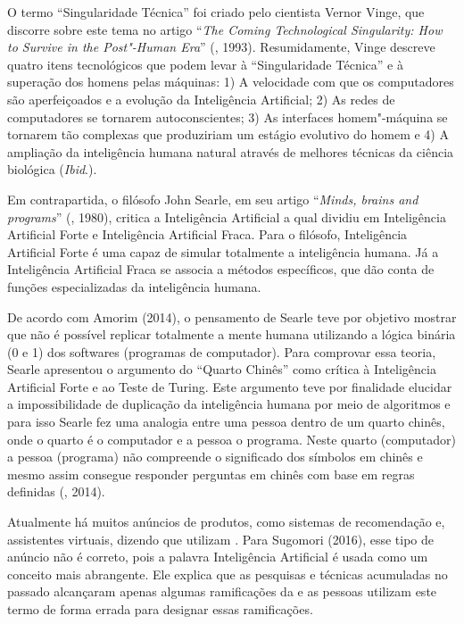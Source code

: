 O termo ``Singularidade Técnica'' foi criado pelo cientista Vernor
Vinge, que discorre sobre este tema no artigo ``\emph{The Coming
Technological Singularity: How to Survive in the Post"-Human Era}''
(, 1993). Resumidamente, Vinge descreve quatro itens tecnológicos
que podem levar à ``Singularidade Técnica'' e à superação dos homens
pelas máquinas: 1) A velocidade com que os computadores são
aperfeiçoados e a evolução da Inteligência Artificial; 2) As redes de
computadores se tornarem autoconscientes; 3) As interfaces homem"-máquina
se tornarem tão complexas que produziriam um estágio evolutivo do homem
e 4) A ampliação da inteligência humana natural através de melhores
técnicas da ciência biológica (\emph{Ibid}.).

Em contrapartida, o filósofo John Searle, em seu artigo ``\emph{Minds,
brains and programs}'' (, 1980), critica a Inteligência
Artificial a qual dividiu em Inteligência Artificial Forte e
Inteligência Artificial Fraca. Para o filósofo, Inteligência Artificial
Forte é uma  capaz de simular totalmente a inteligência humana. Já a
Inteligência Artificial Fraca se associa a métodos específicos, que dão
conta de funções especializadas da inteligência humana.

De acordo com Amorim (2014), o pensamento de Searle teve por objetivo
mostrar que não é possível replicar totalmente a mente humana utilizando
a lógica binária (0 e 1) dos softwares (programas de computador). Para
comprovar essa teoria, Searle apresentou o argumento do ``Quarto
Chinês'' como crítica à Inteligência Artificial Forte e ao Teste de
Turing. Este argumento teve por finalidade elucidar a impossibilidade de
duplicação da inteligência humana por meio de algoritmos e para isso
Searle fez uma analogia entre uma pessoa dentro de um quarto chinês,
onde o quarto é o computador e a pessoa o programa. Neste quarto
(computador) a pessoa (programa) não compreende o significado dos
símbolos em chinês e mesmo assim consegue responder perguntas em chinês
com base em regras definidas (, 2014).

Atualmente há muitos anúncios de produtos, como sistemas de recomendação
e, assistentes virtuais, dizendo que utilizam . Para Sugomori (2016),
esse tipo de anúncio não é correto, pois a palavra Inteligência
Artificial é usada como um conceito mais abrangente. Ele explica que as
pesquisas e técnicas acumuladas no passado alcançaram apenas algumas
ramificações da  e as pessoas utilizam este termo de forma errada para
designar essas ramificações.

